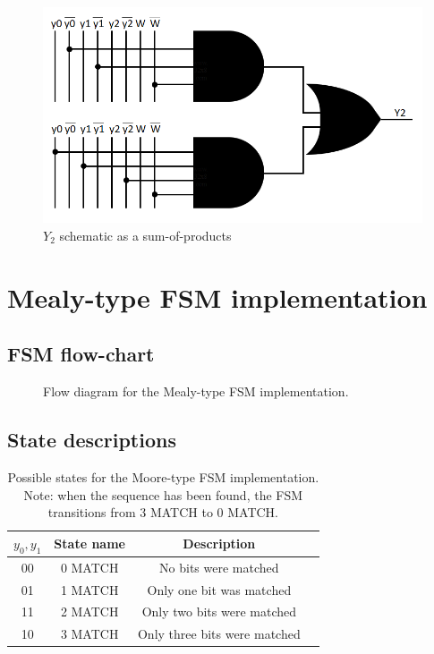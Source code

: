 \documentclass[../../e3_tp3_main.tex]{subfiles}
\begin{document}
\begin{figure}[H]
	\centering
	\includegraphics{figures/Y2_schem.PNG}
	\caption{$Y_2$ schematic as a sum-of-products}
\end{figure}



\section{Mealy-type FSM implementation}
\subsection{FSM flow-chart}
\begin{figure}[H]
	\centering
	
	\caption{Flow diagram for the Mealy-type FSM implementation.}
\end{figure}


\subsection{State descriptions}
\begin{table}[H]	%
	\centering
		\begin{tabular}{|c|c|c|c|}
		\hline 
		$y_0,y_1$ & State name & Description \\ 
		\hline 
		00 & 0 MATCH & No bits were matched \\ 
		\hline 
		01 & 1 MATCH & Only one bit was matched\\ 
		\hline 
		11 & 2 MATCH & Only two bits were matched\\ 
		\hline 
		10 & 3 MATCH & Only three bits were matched \\ 
		\hline
		\end{tabular} 
	\caption{Possible states for the Moore-type FSM implementation. Note: when the sequence has been found, the FSM transitions from 3 MATCH to 0 MATCH.}
	\label{tab:ej2_mealy_states}
\end{table}
\end{document}
